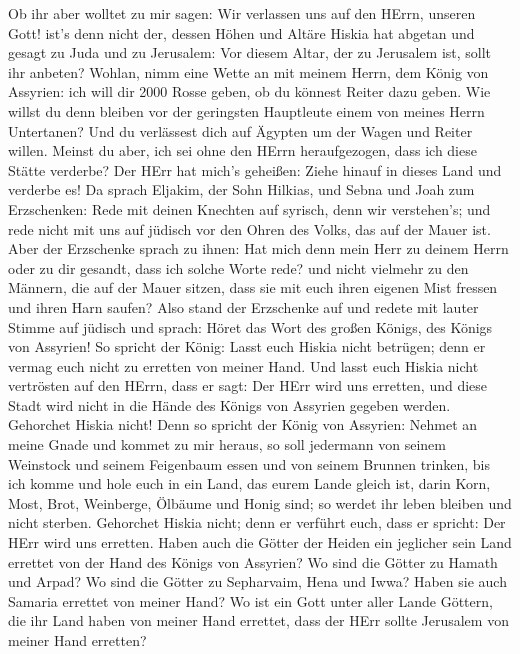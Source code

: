  Ob ihr aber wolltet zu mir sagen: Wir verlassen uns auf
den HErrn, unseren Gott! ist's denn nicht der, dessen Höhen und Altäre
Hiskia hat abgetan und gesagt zu Juda und zu Jerusalem: Vor diesem
Altar, der zu Jerusalem ist, sollt ihr anbeten?  Wohlan,
nimm eine Wette an mit meinem Herrn, dem König von Assyrien: ich will
dir 2000 Rosse geben, ob du könnest Reiter dazu geben.  Wie
willst du denn bleiben vor der geringsten Hauptleute einem von meines
Herrn Untertanen? Und du verlässest dich auf Ägypten um der Wagen und
Reiter willen.  Meinst du aber, ich sei ohne den HErrn
heraufgezogen, dass ich diese Stätte verderbe? Der HErr hat mich's
geheißen: Ziehe hinauf in dieses Land und verderbe es!  Da
sprach Eljakim, der Sohn Hilkias, und Sebna und Joah zum Erzschenken:
Rede mit deinen Knechten auf syrisch, denn wir verstehen's; und rede
nicht mit uns auf jüdisch vor den Ohren des Volks, das auf der Mauer
ist.  Aber der Erzschenke sprach zu ihnen: Hat mich denn
mein Herr zu deinem Herrn oder zu dir gesandt, dass ich solche Worte
rede? und nicht vielmehr zu den Männern, die auf der Mauer sitzen, dass
sie mit euch ihren eigenen Mist fressen und ihren Harn saufen?
 Also stand der Erzschenke auf und redete mit lauter Stimme
auf jüdisch und sprach: Höret das Wort des großen Königs, des Königs von
Assyrien!  So spricht der König: Lasst euch Hiskia nicht
betrügen; denn er vermag euch nicht zu erretten von meiner Hand.
 Und lasst euch Hiskia nicht vertrösten auf den HErrn, dass
er sagt: Der HErr wird uns erretten, und diese Stadt wird nicht in die
Hände des Königs von Assyrien gegeben werden.  Gehorchet
Hiskia nicht! Denn so spricht der König von Assyrien: Nehmet an meine
Gnade und kommet zu mir heraus, so soll jedermann von seinem Weinstock
und seinem Feigenbaum essen und von seinem Brunnen trinken,
 bis ich komme und hole euch in ein Land, das eurem Lande
gleich ist, darin Korn, Most, Brot, Weinberge, Ölbäume und Honig sind;
so werdet ihr leben bleiben und nicht sterben. Gehorchet Hiskia nicht;
denn er verführt euch, dass er spricht: Der HErr wird uns erretten.
 Haben auch die Götter der Heiden ein jeglicher sein Land
errettet von der Hand des Königs von Assyrien?  Wo sind die
Götter zu Hamath und Arpad? Wo sind die Götter zu Sepharvaim, Hena und
Iwwa? Haben sie auch Samaria errettet von meiner Hand?  Wo
ist ein Gott unter aller Lande Göttern, die ihr Land haben von meiner
Hand errettet, dass der HErr sollte Jerusalem von meiner Hand erretten?
